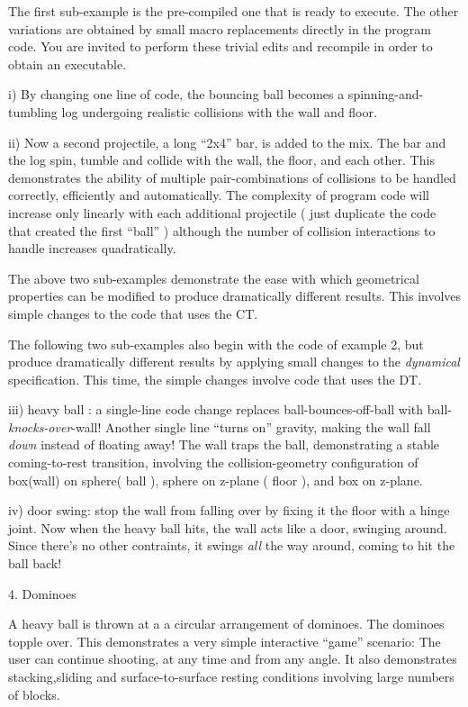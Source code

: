 \documentclass[11pt]{article}
\begin{document}
The first sub-example is the pre-compiled one that is ready to execute. The
other variations are obtained by small macro replacements directly in the
program code. You are invited to perform these trivial edits and recompile
in order to obtain an executable.

i) By changing one line of code, the bouncing ball becomes a
spinning-and-tumbling log undergoing realistic collisions with the wall and
floor. 

ii) Now a second projectile, a long ``2x4'' bar, is added to the mix.
The bar and the log spin, tumble and collide with the wall, the floor, and
  each other. This demonstrates the ability of multiple pair-combinations of
  collisions to be handled correctly, efficiently and automatically. The
  complexity of program code will increase only linearly with each
  additional projectile ( just duplicate the code that created the first
  ``ball'' ) although the number of collision interactions
  to handle increases quadratically.

The above two sub-examples demonstrate the ease with which
geometrical properties can be modified to produce dramatically different
results. This involves simple changes to the code that uses the CT.

The following two sub-examples also begin with the code of example 2, but
produce dramatically different results by applying
small changes to the \emph{dynamical} specification. This time, the simple
changes involve code that uses the DT.

iii) heavy ball : a single-line code change replaces ball-bounces-off-ball
  with ball-\emph{knocks-over}-wall! Another single line ``turns on''
  gravity, making the wall fall \emph{down} instead of floating away!
  The wall traps the ball, demonstrating a stable coming-to-rest
  transition, involving the
  collision-geometry configuration of box(wall) on sphere( ball ), sphere
  on z-plane ( floor ), and box on z-plane.

iv) door swing: stop the wall from falling over by fixing it the floor with
a hinge joint. Now when the heavy ball hits, the wall acts like a door,
swinging around. Since there's no other contraints, it swings \emph{all}
the way around, coming to hit the ball back!


4. Dominoes

A heavy ball is thrown at a a circular arrangement of dominoes.
The dominoes topple over. This demonstrates a very simple interactive
``game'' scenario: The user can continue shooting, at any time and from any
angle.
It also demonstrates stacking,sliding and surface-to-surface resting
    conditions involving large numbers of
    blocks. 
\end{document}
